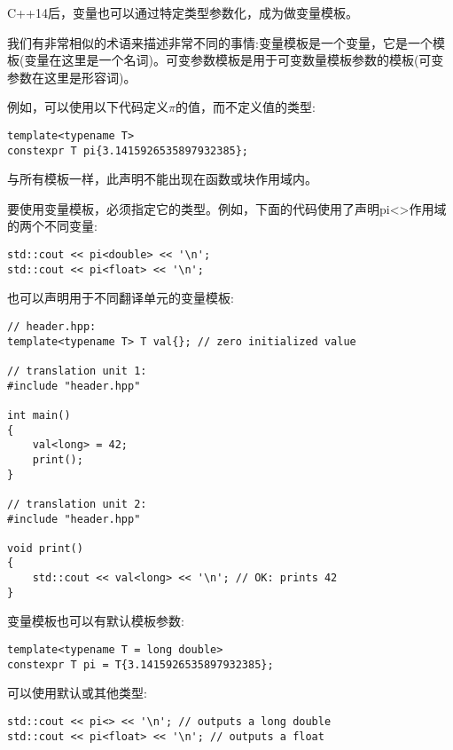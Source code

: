 C++14后，变量也可以通过特定类型参数化，成为做变量模板。

\begin{tcolorbox}[colback=webgreen!5!white,colframe=webgreen!75!black]
\hspace*{0.75cm}我们有非常相似的术语来描述非常不同的事情:变量模板是一个变量，它是一个模板(变量在这里是一个名词)。可变参数模板是用于可变数量模板参数的模板(可变参数在这里是形容词)。
\end{tcolorbox}

例如，可以使用以下代码定义$\pi$的值，而不定义值的类型:

\begin{lstlisting}[style=styleCXX]
template<typename T>
constexpr T pi{3.1415926535897932385};
\end{lstlisting}

与所有模板一样，此声明不能出现在函数或块作用域内。

要使用变量模板，必须指定它的类型。例如，下面的代码使用了声明pi<>作用域的两个不同变量:

\begin{lstlisting}[style=styleCXX]
std::cout << pi<double> << '\n';
std::cout << pi<float> << '\n';
\end{lstlisting}

也可以声明用于不同翻译单元的变量模板:

\begin{lstlisting}[style=styleCXX]
// header.hpp:
template<typename T> T val{}; // zero initialized value

// translation unit 1:
#include "header.hpp"

int main()
{
	val<long> = 42;
	print();
}

// translation unit 2:
#include "header.hpp"

void print()
{
	std::cout << val<long> << '\n'; // OK: prints 42
}
\end{lstlisting}

变量模板也可以有默认模板参数:

\begin{lstlisting}[style=styleCXX]
template<typename T = long double>
constexpr T pi = T{3.1415926535897932385};
\end{lstlisting}

可以使用默认或其他类型:

\begin{lstlisting}[style=styleCXX]
std::cout << pi<> << '\n'; // outputs a long double
std::cout << pi<float> << '\n'; // outputs a float
\end{lstlisting}

